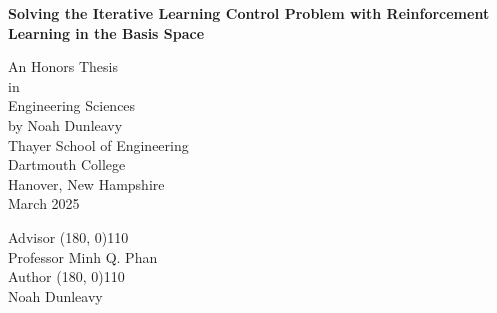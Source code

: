 \pagestyle{plain}
\begin{center}
\textbf{Solving the Iterative Learning Control Problem with Reinforcement Learning in the Basis Space}
\vspace{0.4cm}

An Honors Thesis\\
in\\[0.4cm]
Engineering Sciences\\[0.4cm]
by Noah Dunleavy\\[0.5cm]
Thayer School of Engineering \\
Dartmouth College \\
Hanover, New Hampshire \\[0.4cm]
March 2025 
\vspace{0.5cm}

\end{center}

\begin{flushright}
Advisor \line(180, 0){110} \\
Professor Minh Q. Phan \\[1cm]

Author \line(180, 0){110} \\
Noah Dunleavy \\[1cm]


\end{flushright}
















